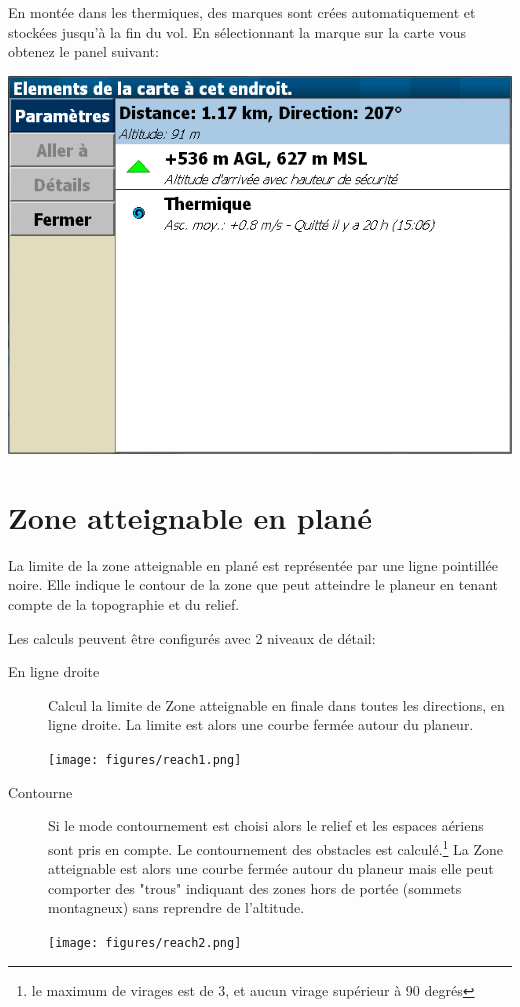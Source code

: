 En montée dans les thermiques, des marques sont crées automatiquement et stockées  jusqu'à la fin du vol. En sélectionnant la marque sur la carte vous obtenez le panel suivant:
\begin{center}
\includegraphics[angle=0,width=0.8\linewidth,keepaspectratio='true']{figures/marque_panel.png}
\end{center}

\section{Zone atteignable en plané }\label{sec:reach}

La limite de la zone atteignable en plané est représentée par une ligne pointillée noire.
Elle indique le contour de la zone que peut atteindre le planeur en tenant compte de la topographie et du relief.
 
Les calculs peuvent être configurés   avec 2 niveaux de détail:
\begin{description}
\item[En ligne droite] Calcul la limite de Zone atteignable en finale dans toutes les directions, en ligne droite. La limite est alors une courbe fermée autour du planeur.
\begin{center}
\texttt{[image: figures/reach1.png]}
\end{center}

\item[Contourne] Si le mode contournement est choisi alors le relief et les espaces aériens sont pris en compte. Le contournement des obstacles est calculé.\footnote{le maximum de virages est de 3, et aucun virage supérieur à 90 degrés}  La Zone atteignable est alors une courbe fermée autour du planeur mais elle peut comporter des "trous" indiquant des zones hors de portée (sommets montagneux) sans reprendre de l'altitude.
\begin{center}
\texttt{[image: figures/reach2.png]}
\end{center}

\end{description}

